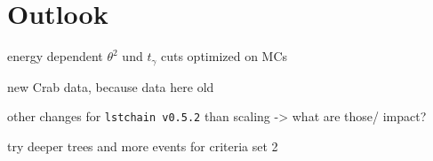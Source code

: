 \chapter{Outlook}

energy dependent $\theta^2$ und $t_\gamma$ cuts optimized on MCs

new Crab data, because data here old

other changes for \texttt{lstchain v0.5.2} than scaling -> what are those/ impact?

try deeper trees and more events for criteria set 2